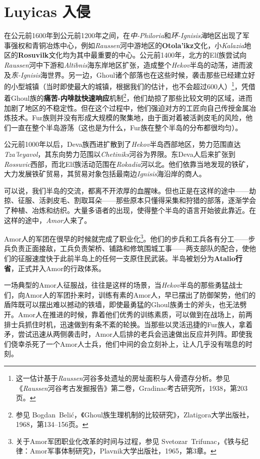 \chapter{Luyicas 入侵}
在公元前1600年到公元前1200年之间，在\textit{中-Philoria}和\textit{环-Ignisis海}地区出现了军事强权和青铜冶炼中心，例如\textit{Raussen}河中游地区的\textbf{Otola'ikz}文化，小\textit{Kalazia}地区的\textbf{Rosuvilk}文化均为其中最重要的中心。公元前1400年，北方的Elf族尝试向\textit{Raussen}河中下游和\textit{Altibnis}海东岸地区扩张，造成整个\textit{Hekov}半岛的动荡，进而波及\textit{东-Ignisis}海世界。另一边，Ghoul诸个部落也在这些时候，袭击那些已经建立好的小型城镇（当时即使最大的城镇，根据我们的估计，也不会超过600人）\footnote{这一估计基于\textit{Raussen}河谷多处遗址的房址面积与人骨遗存分析。参见《\textit{Raussen}河谷考古发掘报告》第二卷，Gradinac考古研究所，1938，第203页。}，凭借着Ghoul族的\textbf{痛苦-内啡肽快速响应}机制\footnote{参见 Bogdan~Belić，《Ghoul族生理机制的比较研究》，Zlatigora大学出版社，1968，第134--156页。}，他们劫掠了那些比较文明的区域，进而加剧了地区的不稳定性。但在这个过程中，他们强迫对方的工匠向自己传授金属冶炼技术。Fur族则并没有形成大规模的聚集地，由于面对着被活剥皮毛的风险，他们一直在整个半岛游荡（这也是为什么，Fur族在整个半岛的分布都很均匀）。

公元前1000年以后，Deva族西进扩散到了\textit{Hekov}半岛西部地区，势力范围直达\textit{Tza'leyavol}，其东向势力范围以\textit{Chetiniks}河谷为界限。东Deva人后来扩张到\textit{Rossuvic}西部，而北Elf族活动范围在\textit{Rokadia}河以北。他们依靠当地发现的铁矿，大力发展铁矿贸易，其贸易对象包括最南边\textit{Ignisis}海沿岸的商人。

可以说，我们半岛的交流，都离不开浓厚的血腥味。但也正是在这样的途中——劫掠、征服、活剥皮毛、割取耳朵——那些原本只懂得采集和狩猎的部落，逐渐学会了种植、冶炼和纺织。大量多语者的出现，使得整个半岛的语言开始彼此靠近。在这样的途中，\textit{Amor}人来了。

Amor人的军团在很早的时候就完成了职业化\footnote{关于Amor军团职业化改革的时间与过程，参见 Svetozar~Trifunac，《铁与纪律：Amor军事体制研究》，Plavnik大学出版社，1965，第3章。}。他们的步兵和工兵各有分工——步兵负责正面接敌，工兵负责架桥、铺路和修筑围城工事——两支部队的配合，使他们的征服速度快于此前半岛上的任何一支原住民武装。半岛被划分为\textbf{Atalio行省}，正式并入Amor的行政体系。

一场典型的Amor人征服战，往往是这样的场景，当\textit{Hekov}半岛的那些勇猛战士们，向Amor人的军团扑来时，训练有素的Amor人，早已摆出了防御架势，他们的盾阵既可以摆出难以撼动的铁墙，即使最勇猛的Ghoul族勇士的斧头，也无法劈开。Amor人在推进的时候，靠着他们优秀的训练素质，可以做到在战场上，前两排士兵抓住时机，迅速做到有条不紊的轮换。当那些以灵活迅捷的Fur族人，拿着矛，尝试迅速从两侧袭击时，Amor人后排的老兵会迅速做出反应并列阵。即使我们侥幸杀死了一个Amor人士兵，他们中间的会立刻补上，让人几乎没有喘息的时刻。

